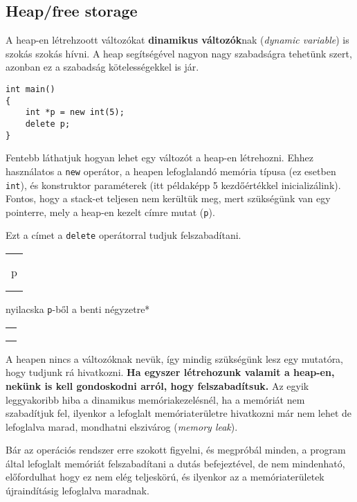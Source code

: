 \documentclass[a4paper,11.5pt]{article}
\begin{document}
	\subsection{Heap/free storage}
	A heap-en létrehzoott változókat \textbf{dinamikus változók}nak (\textit{dynamic variable}) is szokás szokás hívni. A heap segítségével nagyon nagy szabadságra tehetünk szert, azonban ez a szabadság kötelességekkel is jár.
	\begin{lstlisting}
int main()
{
	int *p = new int(5);
	delete p;
}
	\end{lstlisting}
	Fentebb láthatjuk hogyan lehet egy változót a heap-en létrehozni. Ehhez használatos a \texttt{new} operátor, a heapen lefoglalandó memória típusa (ez esetben \texttt{int}), és konstruktor paraméterek (itt példaképp 5 kezdőértékkel inicializálink). Fontos, hogy a stack-et teljesen nem kerültük meg, mert szükségünk van egy pointerre, mely a heap-en kezelt címre mutat (\texttt{p}).
	
	Ezt a címet a \texttt{delete} operátorral tudjuk felszabadítani.
	\begin{center}
		
		\begin{tabular}{|c|}
			\\
			\\
			\quad \quad \quad \quad \quad \\
			p\\
			\\
			\\
			\hline
		\end{tabular}\quad*nyilacska \texttt{p}-ből a benti négyzetre*
		\begin{tabular}{|c|}
			\hline
			\quad \quad\quad \quad \quad \quad  \\
			\quad \quad \fbox{5}\\
			\\
			\hline
		\end{tabular}
	\end{center}
	
	A heapen nincs a változóknak nevük, így mindig szükségünk lesz egy mutatóra, hogy tudjunk rá hivatkozni. \textbf{Ha egyszer létrehozunk valamit a heap-en, nekünk is kell gondoskodni arról, hogy felszabadítsuk.} Az egyik leggyakoribb hiba a dinamikus memóriakezelésnél, ha a memóriát nem szabadítjuk fel, ilyenkor a lefoglalt memóriaterületre hivatkozni már nem lehet de lefoglalva marad, mondhatni elszivárog (\textit{memory leak}). 
	\smallskip
	
	Bár az operációs rendszer erre szokott figyelni, és megpróbál minden, a program által lefoglalt memóriát felszabadítani a dutás befejeztével, de nem mindenható, előfordulhat hogy ez nem elég teljeskörú, és ilyenkor az a memóriaterületek újraindításig lefoglalva maradnak.
	\medskip
	
\end{document}
